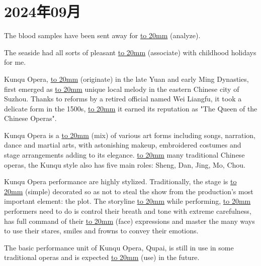 \setcounter{section}{1}
\section{2024年09月}

\item {
    The blood samples have been sent away for \underline{\hbox to 20mm{}} (analyze). 
}

\item {
    The seaside had all sorts of pleasant \underline{\hbox to 20mm{}} (associate) with childhood holidays for me. 
}

\item {
    Kunqu Opera, \underline{\hbox to 20mm{}} (originate) in the late Yuan and early Ming Dynasties, first emerged as \underline{\hbox to 20mm{}} unique local melody in the eastern Chinese city of Suzhou. Thanks to reforms by a retired official named Wei Liangfu, it took a delicate form in the 1500s, \underline{\hbox to 20mm{}} it earned its reputation as "The Queen of the Chinese Operas".

    Kunqu Opera is a \underline{\hbox to 20mm{}} (mix) of various art forms including songs, narration, dance and martial arts, with astonishing makeup, embroidered costumes and stage arrangements adding to its elegance. \underline{\hbox to 20mm{}} many traditional Chinese operas, the Kunqu style also has five main roles: Sheng, Dan, Jing, Mo, Chou.

    Kunqu Opera performance are highly stylized. Traditionally, the stage is \underline{\hbox to 20mm{}} (simple) decorated so as not to steal the show from the production's most important element: the plot. The storyline \underline{\hbox to 20mm{}} while performing, \underline{\hbox to 20mm{}} performers need to do is control their breath and tone with extreme carefulness, has full command of their \underline{\hbox to 20mm{}} (face) expressions and master the many ways to use their stares, smiles and frowns to convey their emotions.

    The basic performance unit of Kunqu Opera, Qupai, is still in use in some traditional operas and is expected \underline{\hbox to 20mm{}} (use) in the future.
}